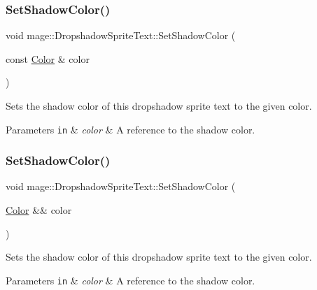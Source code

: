 \subsubsection{\texorpdfstring{Set\+Shadow\+Color()}{SetShadowColor()}\hspace{0.1cm}{\footnotesize\ttfamily [1/3]}}
{\footnotesize\ttfamily void mage\+::\+Dropshadow\+Sprite\+Text\+::\+Set\+Shadow\+Color (\begin{DoxyParamCaption}\item[{const \hyperlink{structmage_1_1_color}{Color} \&}]{color }\end{DoxyParamCaption})\hspace{0.3cm}{\ttfamily [noexcept]}}

Sets the shadow color of this dropshadow sprite text to the given color.


\begin{DoxyParams}[1]{Parameters}
\mbox{\tt in}  & {\em color} & A reference to the shadow color. \\
\hline
\end{DoxyParams}
\hypertarget{classmage_1_1_dropshadow_sprite_text_aa05c94ba64df31046dbdfa3d4d0fdaeb}{}\label{classmage_1_1_dropshadow_sprite_text_aa05c94ba64df31046dbdfa3d4d0fdaeb} 
\subsubsection{\texorpdfstring{Set\+Shadow\+Color()}{SetShadowColor()}\hspace{0.1cm}{\footnotesize\ttfamily [2/3]}}
{\footnotesize\ttfamily void mage\+::\+Dropshadow\+Sprite\+Text\+::\+Set\+Shadow\+Color (\begin{DoxyParamCaption}\item[{\hyperlink{structmage_1_1_color}{Color} \&\&}]{color }\end{DoxyParamCaption})\hspace{0.3cm}{\ttfamily [noexcept]}}

Sets the shadow color of this dropshadow sprite text to the given color.


\begin{DoxyParams}[1]{Parameters}
\mbox{\tt in}  & {\em color} & A reference to the shadow color. \\
\hline
\end{DoxyParams}
\hypertarget{classmage_1_1_dropshadow_sprite_text_a87dd66597ce516d139196d1ce26cb680}{}\label{classmage_1_1_dropshadow_sprite_text_a87dd66597ce516d139196d1ce26cb680} 

